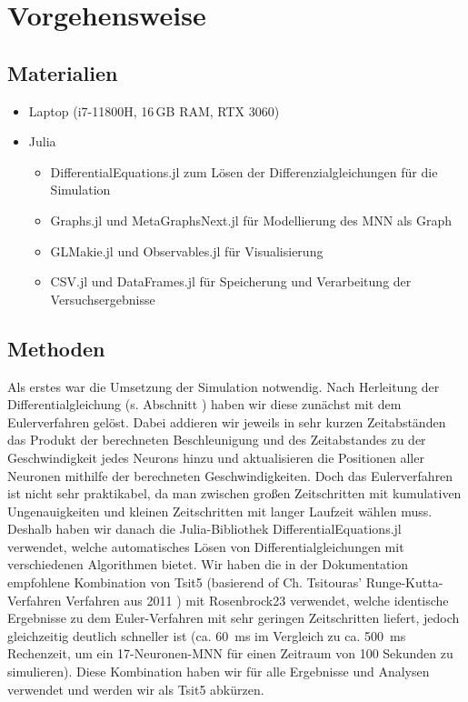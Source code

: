 \documentclass[10pt]{scrartcl}
\begin{document}
\newpage

\section{Vorgehensweise}

\subsection{Materialien}
\begin{itemize}
    \item Laptop (i7-11800H, 16\,GB RAM, RTX 3060)
    \item Julia
    \begin{itemize}
        \item DifferentialEquations.jl zum Lösen der Differenzialgleichungen für die Simulation
        \item Graphs.jl und MetaGraphsNext.jl für Modellierung des MNN als Graph
        \item GLMakie.jl und Observables.jl für Visualisierung
        \item CSV.jl und DataFrames.jl für Speicherung und Verarbeitung der Versuchsergebnisse
    \end{itemize}
\end{itemize}

\subsection{Methoden}

Als erstes war die Umsetzung der Simulation notwendig. Nach Herleitung der Differentialgleichung (s. Abschnitt ) haben wir diese zunächst mit dem Eulerverfahren gelöst.
Dabei addieren wir jeweils in sehr kurzen Zeitabständen das Produkt der berechneten Beschleunigung und des Zeitabstandes zu der Geschwindigkeit jedes Neurons hinzu und aktualisieren die Positionen aller Neuronen mithilfe der berechneten Geschwindigkeiten.
Doch das Eulerverfahren ist nicht sehr praktikabel, da man zwischen großen Zeitschritten mit kumulativen Ungenauigkeiten und kleinen Zeitschritten mit langer Laufzeit wählen muss. Deshalb haben wir danach die Julia-Bibliothek DifferentialEquations.jl verwendet, welche automatisches Lösen von Differentialgleichungen mit verschiedenen Algorithmen bietet. Wir haben die in der Dokumentation \cite{docs:diffeq.jl} empfohlene Kombination von Tsit5 (basierend of Ch. Tsitouras' Runge-Kutta-Verfahren Verfahren aus 2011 \cite{Tsit5}) mit Rosenbrock23 verwendet, welche identische Ergebnisse zu dem Euler-Verfahren mit sehr geringen Zeitschritten liefert, jedoch gleichzeitig deutlich schneller ist (ca. \SI{60}{\milli\second} im Vergleich zu ca. \SI{500}{\milli\second} Rechenzeit, um ein 17-Neuronen-MNN für einen Zeitraum von 100 Sekunden zu simulieren).
Diese Kombination haben wir für alle Ergebnisse und Analysen verwendet und werden wir als Tsit5 abkürzen.
\end{document}
